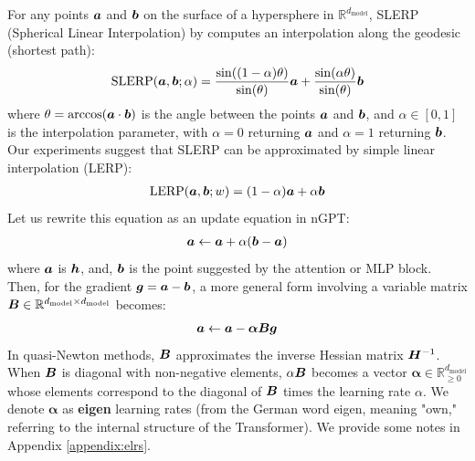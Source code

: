 \documentclass{article} %
\begin{document}
For any points ${\bm{a}}$ and ${\bm{b}}$ on the surface of a hypersphere in $\mathbb{R}^{d_{\text{model}}}$, SLERP (Spherical Linear Interpolation) by \citet{shoemake1985animating} computes an  interpolation along the geodesic (shortest path): 
\begin{align}
\text{SLERP}({\bm{a}}, {\bm{b}}; \alpha) = \frac{\sin((1 - \alpha) \theta)}{\sin(\theta)} {\bm{a}} + \frac{\sin(\alpha \theta)}{\sin(\theta)} {\bm{b}} \label{eq:slerp}
\end{align}
where $\theta = \arccos({\bm{a}} \cdot {\bm{b}})$ is the angle between the points ${\bm{a}}$ and ${\bm{b}}$, and $\alpha \in [0, 1]$ is the interpolation parameter, with $\alpha = 0$ returning ${\bm{a}}$ and $\alpha = 1$ returning ${\bm{b}}$. Our experiments suggest that SLERP can be approximated by simple linear interpolation (LERP):
\begin{align}
\text{LERP}({\bm{a}}, {\bm{b}}; w) = (1 - \alpha)  {\bm{a}} + \alpha {\bm{b}} \label{eq:lerp}
\end{align}
Let us rewrite this equation as an update equation in nGPT:
\begin{align}
{\bm{a}} \leftarrow {\bm{a}} + {\alpha} ({\bm{b}} - {\bm{a}})  \label{eq:geberalupdate}
\end{align}
where ${\bm{a}}$ is ${\bm{h}}$, and, ${\bm{b}}$ is the point suggested by the attention or MLP block. Then, for the gradient ${\bm{g}}={\bm{a}}-{\bm{b}}$, a more general form involving a variable matrix ${\bm{B}}\in \mathbb{R}^{d_{\text{model}} \times d_{\text{model}}}$ becomes:
\begin{align}
{\bm{a}} \leftarrow {\bm{a}} - \bm{\alpha} {\bm{B}} {\bm{g}}
\end{align}
In quasi-Newton methods, ${\bm{B}}$ approximates the inverse Hessian matrix  ${\bm{H}}^{-1}$.%
 When ${\bm{B}}$ is diagonal with non-negative elements, $\alpha {\bm{B}}$ becomes a vector $\bm{\alpha} \in \mathbb{R}_{\geq 0}^{d_{\text{model}}}$ 
 whose elements correspond to the diagonal of ${\bm{B}}$ times the learning rate $\alpha$. We denote $\bm{\alpha}$ as \textbf{eigen }learning rates (from the German word eigen, meaning "own," referring to the internal structure of the Transformer). We provide some notes in Appendix \ref{appendix:elrs}. 
\end{document}
